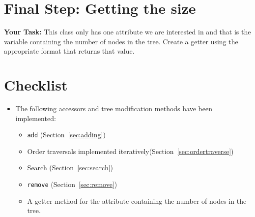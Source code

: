 \documentclass[a4paper]{article}
\begin{document}



\section{Final Step: Getting the size}
\textbf{Your Task:} This class only has one attribute we are interested in and
that is the variable containing the number of nodes in the tree. Create a
getter using the appropriate format that returns that value.


\section{Checklist}

\begin{itemize}
    \item The following accessors and tree modification methods have been implemented:
    \begin{itemize}
        \item[$\square] \lstinline|add| (Section~\ref{sec:adding})
        \item Order traversals implemented iteratively(Section~\ref{sec:ordertraverse})
        \item Search (Section~\ref{sec:search})
        \item[$\square] \lstinline|remove| (Section~\ref{sec:remove})
        \item[$\square$] A getter method for the attribute containing the number of nodes in the tree.
    \end{itemize}
\end{itemize}


\end{document}
